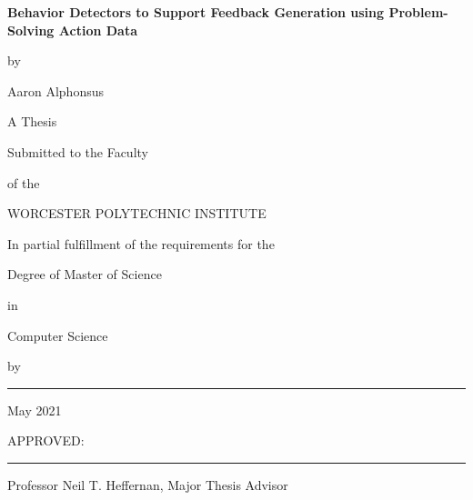 \documentclass[12pt]{report}
\begin{document}
%


%
\newcommand{\brk}{\vspace*{0.18in}}

\thispagestyle{empty}

\begin{center}

\brk


   {\large 
	\textbf{
	    Behavior Detectors to Support Feedback Generation using Problem-Solving Action Data
	}
   }


\brk
by

\brk
Aaron Alphonsus


\brk\brk
A Thesis 

\brk
Submitted to the Faculty

\brk
of the 

\brk
WORCESTER POLYTECHNIC INSTITUTE
	
\brk
In partial fulfillment of the requirements for the

\brk
Degree of Master of Science

\brk
in

\brk
Computer Science

\brk
by

\brk\brk
\rule{3in}{1.2pt}

\brk
May 2021

\end{center}

	
\vfill
APPROVED:

\vspace{0.35in}
\rule{3in}{0.8pt}

Professor Neil T. Heffernan, Major Thesis Advisor
\end{document}
